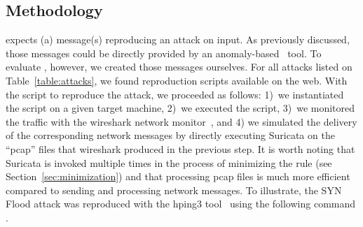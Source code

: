 \documentclass[sigconf,anonymous]{acmart}
\begin{document}
\subsection{Methodology}

\tname{} expects (a) message(s) reproducing an attack on input. As
previously discussed, those messages could be directly provided by an
anomaly-based \nids\ tool. To evaluate \tname{}, however, we created
those messages ourselves. For all attacks listed on
Table~\ref{table:attacks}, we found reproduction scripts available on
the web. With the script to reproduce the attack, we proceeded as
follows: 1)~we instantiated the script on a given target machine,
2)~we executed the script, 3)~we monitored the traffic with the
wireshark network monitor~\cite{wireshark-net-monitor}, and 4) we
simulated the delivery of the corresponding network messages by
directly executing Suricata on the ``pcap'' files that wireshark
produced in the previous step. It is worth noting that Suricata is
invoked multiple times in the process of minimizing the rule (see
Section~\ref{sec:minimization}) and that processing pcap files is much
more efficient compared to sending and processing network messages. To
illustrate, the SYN Flood attack was reproduced with the hping3
tool~\cite{hping3} using the following command .

\end{document}
